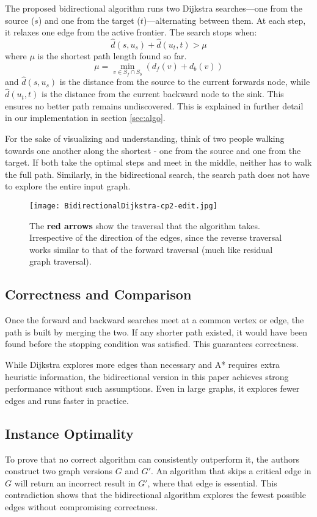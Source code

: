 \documentclass[12pt]{article}
\begin{document}
The proposed bidirectional algorithm runs two Dijkstra searches—one from the source ($s$) and one from the target ($t$)—alternating between them. At each step, it relaxes one edge from the active frontier. The search stops when:
\[
\hat{d}(s,u_s) + \hat{d}(u_t, t) > \mu
\]
where \( \mu \) is the shortest path length found so far.
\[
\mu = \min_{v \in S_f \cap S_b}(d_f(v) + d_b(v))
\]
and $\hat{d}(s,u_s)$ is the distance from the source to the current forwards node, while $\hat{d}(u_t, t)$ is the distance from the current backward node to the sink. This ensures no better path remains undiscovered. This is explained in further detail in our implementation in section \ref{sec:algo}.

For the sake of visualizing and understanding, think of two people walking towards one another along the shortest - one from the source and one from the target. If both take the optimal steps and meet in the middle, neither has to walk the full path. Similarly, in the bidirectional search, the search path does not have to explore the entire input graph. 

\begin{figure}[h]
\centering
\texttt{[image: BidirectionalDijkstra-cp2-edit.jpg]}
\caption{The \textbf{red arrows} show the traversal that the algorithm takes. Irrespective of the direction of the edges, since the reverse traversal works similar to that of the forward traversal (much like residual graph traversal).}
\end{figure}

\subsection{Correctness and Comparison}
Once the forward and backward searches meet at a common vertex or edge, the path is built by merging the two. If any shorter path existed, it would have been found before the stopping condition was satisfied. This guarantees correctness.

While Dijkstra explores more edges than necessary and A* requires extra heuristic information, the bidirectional version in this paper achieves strong performance without such assumptions. Even in large graphs, it explores fewer edges and runs faster in practice.

\subsection{Instance Optimality}
To prove that no correct algorithm can consistently outperform it, the authors construct two graph versions \( G \) and \( G' \). An algorithm that skips a critical edge in \( G \) will return an incorrect result in \( G' \), where that edge is essential. This contradiction shows that the bidirectional algorithm explores the fewest possible edges without compromising correctness.
\end{document}
